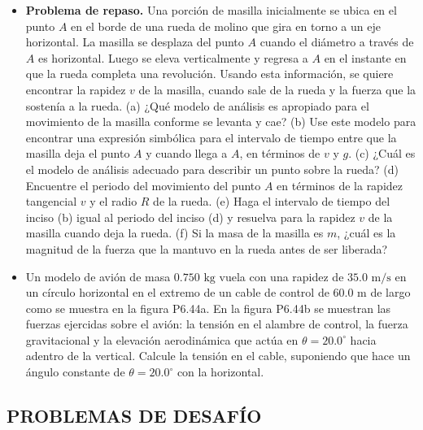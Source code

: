\documentclass[11pt,a4paper]{article}
\begin{document}
\begin{itemize}
    \item[\textbf{43.}] \textbf{Problema de repaso.} Una porción de masilla inicialmente se ubica en el punto $A$ en el borde de una rueda de molino que gira en torno a un eje horizontal. La masilla se desplaza del punto $A$ cuando el diámetro a través de $A$ es horizontal. Luego se eleva verticalmente y regresa a $A$ en el instante en que la rueda completa una revolución. Usando esta información, se quiere encontrar la rapidez $v$ de la masilla, cuando sale de la rueda y la fuerza que la sostenía a la rueda. (a) ¿Qué modelo de análisis es apropiado para el movimiento de la masilla conforme se levanta y cae? (b) Use este modelo para encontrar una expresión simbólica para el intervalo de tiempo entre que la masilla deja el punto $A$ y cuando llega a $A$, en términos de $v$ y $g$. (c) ¿Cuál es el modelo de análisis adecuado para describir un punto sobre la rueda? (d) Encuentre el periodo del movimiento del punto $A$ en términos de la rapidez tangencial $v$ y el radio $R$ de la rueda. (e) Haga el intervalo de tiempo del inciso (b) igual al periodo del inciso (d) y resuelva para la rapidez $v$ de la masilla cuando deja la rueda. (f) Si la masa de la masilla es $m$, ¿cuál es la magnitud de la fuerza que la mantuvo en la rueda antes de ser liberada?
    \vspace*{8cm}

    \item[\textbf{44.}] Un modelo de avión de masa $0.750 \text{ kg}$ vuela con una rapidez de $35.0 \text{ m/s}$ en un círculo horizontal en el extremo de un cable de control de $60.0 \text{ m}$ de largo como se muestra en la figura P6.44a. En la figura P6.44b se muestran las fuerzas ejercidas sobre el avión: la tensión en el alambre de control, la fuerza gravitacional y la elevación aerodinámica que actúa en $\theta = 20.0^\circ$ hacia adentro de la vertical. Calcule la tensión en el cable, suponiendo que hace un ángulo constante de $\theta = 20.0^\circ$ con la horizontal.
    \vspace*{7cm}
\end{itemize}

\newpage

\subsection*{PROBLEMAS DE DESAFÍO}
\end{document}
